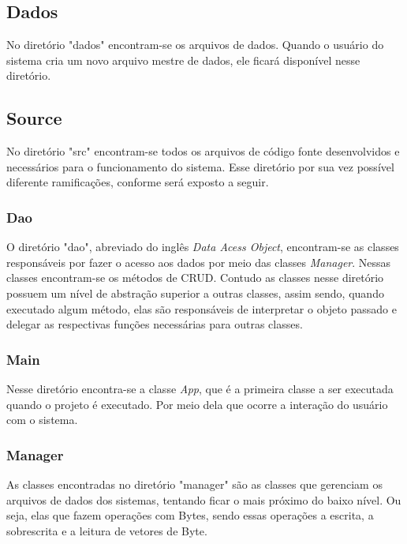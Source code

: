 \subsection{\esp Dados}

No diretório "dados" encontram-se os arquivos de dados. Quando o usuário do sistema cria um novo arquivo mestre de dados, ele ficará disponível nesse diretório.

\subsection{\esp Source}

No diretório "src" encontram-se todos os arquivos de código fonte desenvolvidos e necessários para o funcionamento do sistema. Esse diretório por sua vez possível diferente ramificações, conforme será exposto a seguir.

\subsubsection{\esp Dao}

O diretório "dao", abreviado do inglês \textit{Data Acess Object}, encontram-se as classes responsáveis por fazer o acesso aos dados por meio das classes \textit{Manager}. Nessas classes encontram-se os métodos de CRUD. Contudo as classes nesse diretório possuem um nível de abstração superior a outras classes, assim sendo, quando executado algum método, elas são responsáveis de interpretar o objeto passado e delegar as respectivas funções necessárias para outras classes.

\subsubsection{\esp Main}

Nesse diretório encontra-se a classe \textit{App}, que é a primeira classe a ser executada quando o projeto é executado. Por meio dela que ocorre a interação do usuário com o sistema.

\subsubsection{\esp Manager}
 
As classes encontradas no diretório "manager" são as classes que gerenciam os arquivos de dados dos sistemas, tentando ficar o mais próximo do baixo nível. Ou seja, elas que fazem operações com Bytes, sendo essas operações a escrita, a sobrescrita e a leitura de vetores de Byte. 

